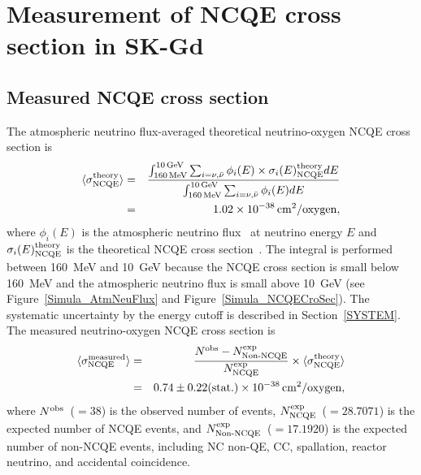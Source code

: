 
%
%

\section{Measurement of NCQE cross section in SK-Gd}\label{Sec_NCQE}





\subsection{Measured NCQE cross section}
\vs\hs
The atmospheric neutrino flux-averaged theoretical neutrino-oxygen NCQE cross section is
\begin{eqnarray}
	\langle \sigma^{\rm theory}_{\rm NCQE} \rangle &=& \frac{\int_{\rm 160\,MeV}^{\rm 10\,GeV}\sum_{i=\nu,\bar{\nu}}\phi_{i}(E)\times\sigma_{i}(E)^{\rm theory}_{\rm NCQE}dE}{\int_{\rm 160\,MeV}^{\rm 10\,GeV}\sum_{i=\nu,\bar{\nu}}\phi_{i}(E)dE} \nonumber \\
																								 &=& 1.02 \times 10^{-38}\,{\rm cm}^{2}/{\rm oxygen},\label{Eq_theory}
\end{eqnarray}
where $\phi_{i}(E)$ is the atmospheric neutrino flux~\cite{2011Honda} at neutrino energy $E$ and $\sigma_{i}(E)^{\rm theory}_{\rm NCQE}$ is the theoretical NCQE cross section~\cite{2012Ankowski}.
The integral is performed between 160~MeV and 10~GeV because the NCQE cross section is small below 160~MeV and the atmospheric neutrino flux is small above 10~GeV (see Figure~\ref{Simula_AtmNeuFlux} and Figure~\ref{Simula_NCQECroSec}).
The systematic uncertainty by the energy cutoff is described in Section~\ref{SYSTEM}.
The measured neutrino-oxygen NCQE cross section is
\begin{eqnarray}
	\langle \sigma^{\rm measured}_{\rm NCQE} \rangle &=&\frac{N^{\rm obs}-N^{\rm exp}_{\rm Non\mathchar`-NCQE}}{N^{\rm exp}_{\rm NCQE}}\times\langle \sigma^{\rm theory}_{\rm NCQE} \rangle \nonumber \\
																									 &=& 0.74 \pm 0.22 ({\rm stat.}) \times 10^{-38}\,{\rm cm}^{2}/{\rm oxygen},\label{Eq_measured}
\end{eqnarray}
where $N^{\rm obs}$~($=38$) is the observed number of events, $N^{\rm exp}_{\rm NCQE}$~($=28.7071$) is the expected number of NCQE events, and $N^{\rm exp}_{\rm Non\mathchar`-NCQE}$~($=17.1920$) is the expected number of non-NCQE events, including NC non-QE, CC, spallation, reactor neutrino, and accidental coincidence.

